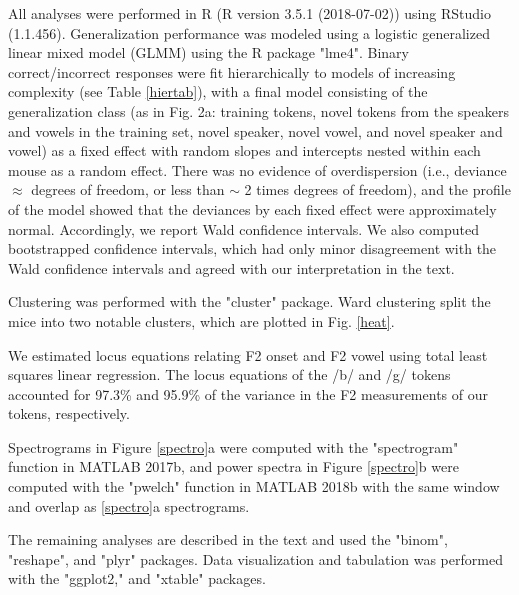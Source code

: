 All analyses were performed in R (R version 3.5.1 (2018-07-02))\cite{Team2016} using RStudio (1.1.456)\cite{Team2015}. Generalization performance was modeled using a logistic generalized linear mixed model (GLMM) using the R package "lme4"\cite{Bates2015}. Binary correct/incorrect responses were fit hierarchically to models of increasing complexity (see Table \ref{hiertab}), with a final model consisting of the generalization class (as in Fig. 2a: training tokens, novel tokens from the speakers and vowels in the training set, novel speaker, novel vowel, and novel speaker and vowel) as a fixed effect with random slopes and intercepts nested within each mouse as a random effect. There was no evidence of overdispersion (i.e., deviance $\approx$ degrees of freedom, or less than  $\sim$ 2 times degrees of freedom), and the profile of the model showed that the deviances by each fixed effect were approximately normal. Accordingly, we report Wald confidence intervals. We also computed bootstrapped confidence intervals, which had only minor disagreement with the Wald confidence intervals and agreed with our interpretation in the text.

Clustering was performed with the "cluster"\cite{Maechler2017} package. Ward clustering split the mice into two notable clusters, which are plotted in Fig. \ref{heat}.

We estimated locus equations relating F2 onset and F2 vowel using total least squares linear regression. The locus equations of the /b/ and /g/ tokens accounted for 97.3\% and 95.9\% of the variance in the F2 measurements of our tokens, respectively.

Spectrograms in Figure \ref{spectro}a were computed with the "spectrogram" function in MATLAB 2017b, and power spectra in Figure \ref{spectro}b were computed with the "pwelch" function in MATLAB 2018b with the same window and overlap as \ref{spectro}a spectrograms.

The remaining analyses are described in the text and used the "binom"\cite{Sundar2014}, "reshape"\cite{Wickham2007}, and "plyr"\cite{Wickham2011} packages. Data visualization and tabulation was performed with the "ggplot2,"\cite{Wickham2009} and "xtable"\cite{Dahl2016} packages.



